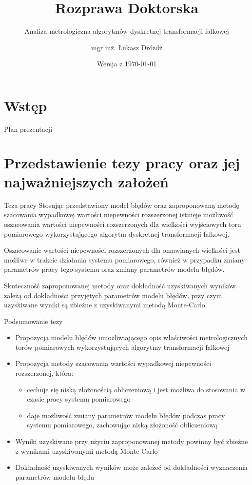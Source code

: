 \documentclass[12pt, polish, aspectratio = 169]{beamer}
\title{Rozprawa Doktorska}
\author{mgr inż. Łukasz Dróżdż}
\subtitle{Analiza metrologiczna algorytmów dyskretnej transformacji falkowej}
\institute{Politechnika Śląska, Wydział Elektryczny \\ Katedra Metrologii, Elektroniki i Automatyki}
\date{Wersja \gitVer{} z \today{}}
\begin{document}
\section*{Wstęp}

\begin{frame}[plain]
\titlepage
\end{frame}

\begin{frame}{Plan prezentacji}
\tableofcontents
\end{frame}

\section{Przedstawienie tezy pracy oraz jej najważniejszych założeń}

\begin{frame}{Teza pracy}
\justifying
Stosując przedstawiony model błędów oraz zaproponowaną metodę szacowania wypadkowej wartości niepewności rozszerzonej istnieje możliwość oszacowania wartości niepewności rozszerzonych dla wielkości wyjściowych toru pomiarowego wykorzystującego algorytm dyskretnej transformacji falkowej.

Oszacowanie wartości niepewności rozszerzonych dla omawianych wielkości jest możliwe w trakcie działania systemu pomiarowego, również w przypadku zmiany parametrów pracy tego systemu oraz zmiany parametrów modelu błędów.

Skuteczność zaproponowanej metody oraz dokładność uzyskiwanych wyników zależą od dokładności przyjętych parametrów modelu błędów, przy czym uzyskiwane wyniki są zbieżne z uzyskiwanymi metodą Monte-Carlo.
\end{frame}

\begin{frame}{Podsumowanie tezy}
\begin{itemize}
\item Propozycja modelu błędów umożliwiającego opis właściwości metrologicznych torów pomiarowych wykorzystujących algorytmy transformacji falkowej
\item Propozycja metody szacowania wartości wypadkowej niepewności rozszerzonej, która:
	\begin{itemize}
	\item cechuje się niską złożonością obliczeniową i jest możliwa do stosowania w czasie pracy systemu pomiarowego
	\item daje możliwość zmiany parametrów modelu błędów podczas pracy systemu pomiarowego, zachowując niską złożoność obliczeniową
	\end{itemize}
\item Wyniki uzyskiwane przy użyciu zaproponowanej metody powinny być zbieżne z wynikami uzyskiwanymi metodą Monte-Carlo
\item Dokładność uzyskiwanych wyników może zależeć od dokładności wyznaczenia parametrów modelu błędu
\end{itemize}
\end{frame}
\end{document}
